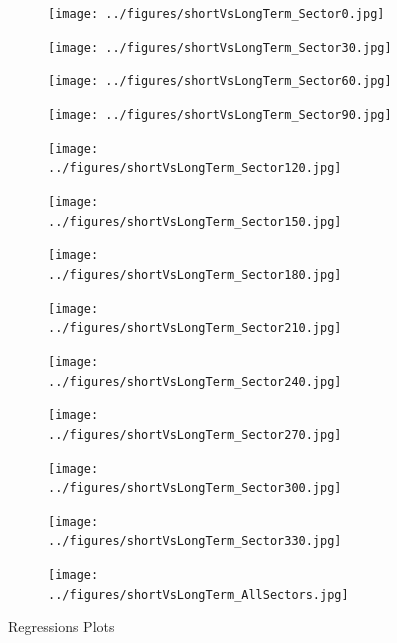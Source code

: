 \documentclass[10pt]{article}
\begin{document}
\begin{figure}[H]
\begin{subfigure}{0.3\textwidth}
  \centering
  \texttt{[image: ../figures/shortVsLongTerm\_Sector0.jpg]}
\end{subfigure}
\begin{subfigure}{0.3\textwidth}
  \centering
  \texttt{[image: ../figures/shortVsLongTerm\_Sector30.jpg]}
\end{subfigure}
\begin{subfigure}{0.3\textwidth}
  \centering
  \texttt{[image: ../figures/shortVsLongTerm\_Sector60.jpg]}
\end{subfigure}
\begin{subfigure}{0.3\textwidth}
  \centering
  \texttt{[image: ../figures/shortVsLongTerm\_Sector90.jpg]}
\end{subfigure}
\begin{subfigure}{0.3\textwidth}
  \centering
  \texttt{[image: ../figures/shortVsLongTerm\_Sector120.jpg]}
\end{subfigure}
\begin{subfigure}{0.3\textwidth}
  \centering
  \texttt{[image: ../figures/shortVsLongTerm\_Sector150.jpg]}
\end{subfigure}
\begin{subfigure}{0.3\textwidth}
  \centering
  \texttt{[image: ../figures/shortVsLongTerm\_Sector180.jpg]}
\end{subfigure}
\begin{subfigure}{0.3\textwidth}
  \centering
  \texttt{[image: ../figures/shortVsLongTerm\_Sector210.jpg]}
\end{subfigure}
\begin{subfigure}{0.3\textwidth}
  \centering
  \texttt{[image: ../figures/shortVsLongTerm\_Sector240.jpg]}
\end{subfigure}
\begin{subfigure}{0.3\textwidth}
  \centering
  \texttt{[image: ../figures/shortVsLongTerm\_Sector270.jpg]}
\end{subfigure}
\begin{subfigure}{0.3\textwidth}
  \centering
  \texttt{[image: ../figures/shortVsLongTerm\_Sector300.jpg]}
\end{subfigure}
\begin{subfigure}{0.3\textwidth}
  \centering
  \texttt{[image: ../figures/shortVsLongTerm\_Sector330.jpg]}
\end{subfigure}
\begin{subfigure}{0.3\textwidth}
  \centering
  \texttt{[image: ../figures/shortVsLongTerm\_AllSectors.jpg]}
\end{subfigure}
  \caption{Regressions Plots}
\label{fig:CompWeibull}
\end{figure}
\end{document}
